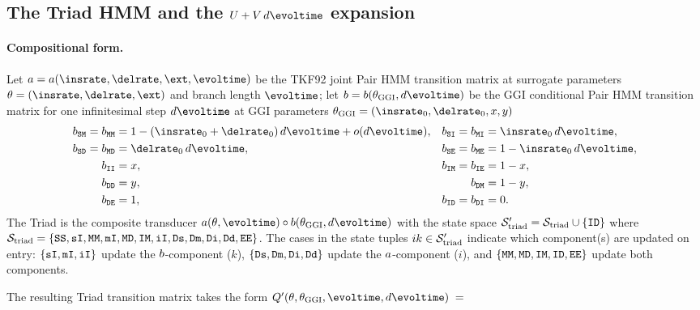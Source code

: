 \subsection{The Triad HMM and the \texorpdfstring{$U + V\,d\evoltime$}{U + V*dt} expansion}
\label{sec:comp-triad-hmm}

\paragraph{Compositional form.}
Let $\ymx=\jointpairmatrix(\insrate,\delrate,\fragext,\evoltime)$ be the
TKF92 joint Pair HMM transition matrix at surrogate parameters
$\theta=(\insrate,\delrate,\fragext)$ and branch length $\evoltime$; let
$\zmx=\condpairmatrix(\theta_\ggi,d\evoltime)$ be the GGI conditional
Pair HMM transition matrix for one infinitesimal step
$d\evoltime$ at GGI parameters $\theta_\ggi=(\insrate_0,\delrate_0,x,y)$
\begin{align*}
\tz{\sta\mat} = \tz{\mat\mat} &= 1 - (\insrate_0+\delrate_0)\,d\evoltime + o(d\evoltime), &
\tz{\sta\ins} = \tz{\mat\ins} &= \insrate_0\,d\evoltime, \\
\tz{\sta\del} = \tz{\mat\del} &= \delrate_0\,d\evoltime, &
\tz{\sta\fin} = \tz{\mat\fin} &= 1 - \insrate_0\,d\evoltime, \\
\tz{\ins\ins} &= x, & \tz{\ins\mat} = \tz{\ins\fin} &= 1-x, \\
\tz{\del\del} &= y, & \tz{\del\mat} &= 1-y, \\
\tz{\del\fin} &= 1, & \tz{\ins\del} = \tz{\del\ins} &= 0.
\end{align*}
The Triad is the composite transducer
$\jointpairhmm(\theta,\evoltime)\circ\condpairhmm(\theta_\ggi,d\evoltime)$
with the state space $\mathcal{S}_{\rm triad}'=\mathcal{S}_{\rm triad} \cup \{\mathtt{ID}\}$ where
$\mathcal{S}_{\rm triad}=\{\mathtt{SS},\mathtt{sI},\mathtt{MM},\mathtt{mI},\mathtt{MD},\mathtt{IM},\mathtt{iI},\mathtt{Ds},\mathtt{Dm},\mathtt{Di},\mathtt{Dd},\mathtt{EE}\}$.
The cases in the state tuples $ik \in \mathcal{S}_{\rm triad}'$ indicate which component(s) are updated on entry:
$\{\mathtt{sI},\mathtt{mI},\mathtt{iI}\}$ update the $b$-component ($k$),
$\{\mathtt{Ds},\mathtt{Dm},\mathtt{Di},\mathtt{Dd}\}$ update the $a$-component ($i$), and
$\{\mathtt{MM},\mathtt{MD},\mathtt{IM},\mathtt{ID},\mathtt{EE}\}$ update both components.

The resulting Triad transition matrix takes the form
$ Q'(\theta,\theta_\ggi,\evoltime,d\evoltime) \;=\; $

